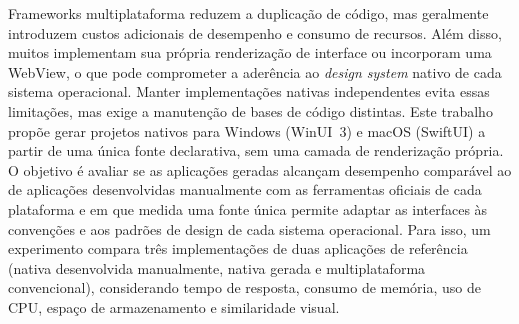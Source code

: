 \begin{resumo}
    Frameworks multiplataforma reduzem a duplicação de código, mas geralmente introduzem custos adicionais de desempenho e consumo de recursos. Além disso, muitos implementam sua própria renderização de interface ou incorporam uma WebView, o que pode comprometer a aderência ao \textit{design system} nativo de cada sistema operacional. Manter implementações nativas independentes evita essas limitações, mas exige a manutenção de bases de código distintas. Este trabalho propõe gerar projetos nativos para Windows (WinUI~3) e macOS (SwiftUI) a partir de uma única fonte declarativa, sem uma camada de renderização própria. O objetivo é avaliar se as aplicações geradas alcançam desempenho comparável ao de aplicações desenvolvidas manualmente com as ferramentas oficiais de cada plataforma e em que medida uma fonte única permite adaptar as interfaces às convenções e aos padrões de design de cada sistema operacional. Para isso, um experimento compara três implementações de duas aplicações de referência (nativa desenvolvida manualmente, nativa gerada e multiplataforma convencional), considerando tempo de resposta, consumo de memória, uso de CPU, espaço de armazenamento e similaridade visual.

\end{resumo}
